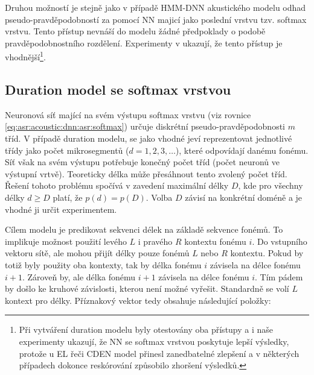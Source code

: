Druhou možností je stejně jako v případě HMM-DNN akustického modelu odhad pseudo-pravděpodobností za pomocí NN majicí jako poslední vrstvu tzv. softmax vrstvu. Tento přístup nevnáší do modelu žádné předpoklady o podobě pravděpodobnostního rozdělení. Experimenty v \cite{Hadian2017} ukazují, že tento přístup je vhodnější\footnote{Při vytváření duration modelu byly otestovány oba přístupy a i naše experimenty ukazují, že NN se softmax vrstvou poskytuje lepší výsledky, protože u EL řeči CDEN model přinesl zanedbatelné zlepšení a v některých případech dokonce reskórování způsobilo zhoršení výsledků.}.

\subsection{Duration model se softmax vrstvou}
\label{chap:realisation:durationmodels:nn:softmax}

Neuronová síť mající na svém výstupu softmax vrstvu (viz rovnice \ref{eq:asr:acoustic:dnn:asr:softmax}) určuje diskrétní pseudo-pravděpodobnosti $m$ tříd. V případě duration modelu, se jako vhodné jeví reprezentovat jednotlivé třídy jako počet mikrosegmentů ($d=1,2,3,\dots$), které odpovídají danému fonému. Síť však na svém výstupu potřebuje konečný počet tříd (počet neuronů ve výstupní vrtvě). Teoreticky délka může přesáhnout tento zvolený počet tříd. Řešení tohoto problému spočívá v zavedení maximální délky $D$, kde pro všechny délky $d \geq D$ platí, že $p\left(d\right) = p\left(D\right)$. \cite{Hadian2017} Volba $D$ závisí na konkrétní doméně a je vhodné ji určit experimentem.

Cílem modelu je predikovat sekvenci délek na základě sekvence fonémů. To implikuje možnost použití levého $L$ i pravého $R$ kontextu fonému $i$. Do vstupního vektoru sítě, ale mohou přijít délky pouze fonémů $L$ nebo $R$ kontextu. Pokud by totiž byly použity oba kontexty, tak by délka fonému $i$ závisela na délce fonému $i+1$. Zároveň by, ale délka fonému $i+1$ závisela na délce fonému $i$. Tím pádem by došlo ke kruhové závislosti, kterou není možné vyřešit. Standardně se volí $L$ kontext pro délky. Příznakový vektor tedy obsahuje následující položky:

